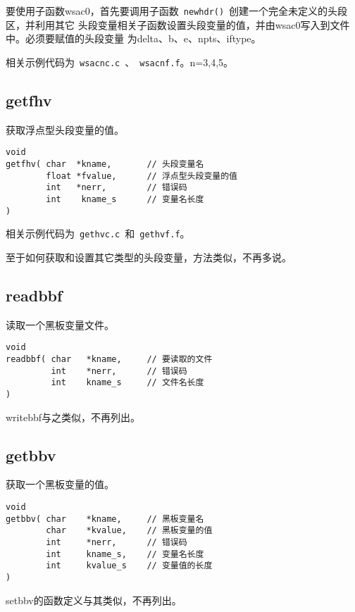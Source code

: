 要使用子函数wsac0，首先要调用子函数~\lstinline{newhdr()}~创建一个完全未定义的头段区，并利用其它
头段变量相关子函数设置头段变量的值，并由wsac0写入到文件中。必须要赋值的头段变量
为delta、b、e、npts、iftype。

相关示例代码为~\lstinline{wsacnc.c}~、~\lstinline{wsacnf.f}。n=3,4,5。

\subsection{getfhv}
获取浮点型头段变量的值。
\begin{lstlisting}[style=C]
void                                                                                
getfhv( char  *kname,       // 头段变量名
        float *fvalue,      // 浮点型头段变量的值                                              
        int   *nerr,        // 错误码                                    
        int    kname_s      // 变量名长度
)
\end{lstlisting}

相关示例代码为~\lstinline{gethvc.c}~和~\lstinline{gethvf.f}。

至于如何获取和设置其它类型的头段变量，方法类似，不再多说。

\subsection{readbbf}
读取一个黑板变量文件。
\begin{lstlisting}[style=C]
void
readbbf( char   *kname,     // 要读取的文件
         int    *nerr,      // 错误码
         int    kname_s     // 文件名长度
)
\end{lstlisting} 

writebbf与之类似，不再列出。

\subsection{getbbv}
获取一个黑板变量的值。
\begin{lstlisting}[style=C]
void
getbbv( char    *kname,     // 黑板变量名
        char    *kvalue,    // 黑板变量的值
        int     *nerr,      // 错误码
        int     kname_s,    // 变量名长度      
        int     kvalue_s    // 变量值的长度
)
\end{lstlisting}
setbbv的函数定义与其类似，不再列出。
